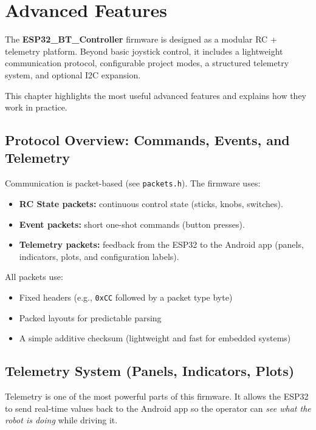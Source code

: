 \chapter{Advanced Features}
\label{ch:advanced-features}

The \textbf{ESP32\_BT\_Controller} firmware is designed as a modular RC + telemetry platform.
Beyond basic joystick control, it includes a lightweight communication protocol, configurable
project modes, a structured telemetry system, and optional I2C expansion.

This chapter highlights the most useful advanced features and explains how they work in practice.

\section{Protocol Overview: Commands, Events, and Telemetry}
\label{sec:protocol-overview}

Communication is packet-based (see \texttt{packets.h}). The firmware uses:

\begin{itemize}
    \item \textbf{RC State packets:} continuous control state (sticks, knobs, switches).
    \item \textbf{Event packets:} short one-shot commands (button presses).
    \item \textbf{Telemetry packets:} feedback from the ESP32 to the Android app (panels, indicators, plots, and configuration labels).
\end{itemize}

All packets use:
\begin{itemize}
    \item Fixed headers (e.g., \texttt{0xCC} followed by a packet type byte)
    \item Packed layouts for predictable parsing
    \item A simple additive checksum (lightweight and fast for embedded systems)
\end{itemize}

\section{Telemetry System (Panels, Indicators, Plots)}
\label{sec:telemetry}

Telemetry is one of the most powerful parts of this firmware. It allows the ESP32 to send
real-time values back to the Android app so the operator can \emph{see what the robot is doing}
while driving it.

